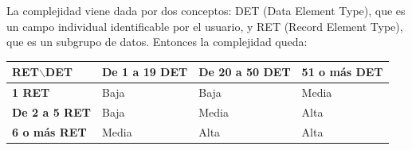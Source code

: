 \documentclass[spanish,a4paper,12pt]{report}	%
\begin{document}
	La complejidad viene dada por dos conceptos: DET (Data Element Type), que es un campo individual identificable por el usuario, y RET (Record Element Type), que es un subgrupo de datos. Entonces la complejidad queda: 

\vspace{0.35cm}

			\begin{tabular}{|p{3cm}||p{3cm}|p{3.2cm}|p{3cm}|}
				\hline
				\textbf{RET$\backslash$DET} & \textbf{De 1 a 19 DET} & \textbf{De 20 a 50 DET} & \textbf{51  o más DET} \\ \hline \hline
				\textbf{1 RET} & Baja & Baja & Media \\ \hline 
				\textbf{De 2 a 5 RET} & Baja & Media & Alta \\ \hline 
				\textbf{6 o más RET} & Media & Alta & Alta \\ \hline 
			\end{tabular}

\vspace{0.35cm}
\end{document}
